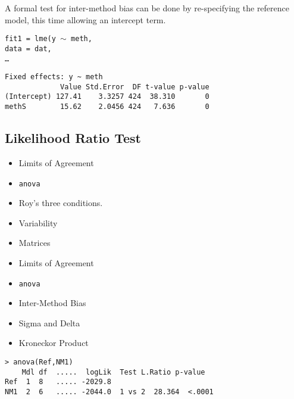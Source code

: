 \begin{frame}{\bf {}}
\begin{frame}{\bf {}}
\begin{itemize}
\begin{frame}[fragile]{\bf {}}
A formal test for inter-method bias can be done by re-specifying the reference model, this time allowing an intercept term.

\texttt{fit1 = lme(y $\sim$ meth,\\
   \hspace{0.6cm} data = dat,\\
   \hspace{0.6cm} \ldots}

\begin{verbatim}
Fixed effects: y ~ meth
             Value Std.Error  DF t-value p-value
(Intercept) 127.41    3.3257 424  38.310       0
methS        15.62    2.0456 424   7.636       0

\end{verbatim}
\end{frame}


\subsection{Likelihood Ratio Test}
\begin{frame}{\bf {}}
\begin{itemize}\itemsep0.7cm
\item Limits of Agreement
\item \texttt{anova}
\item Roy's three conditions.
\item Variability
\item Matrices
\end{itemize}
\end{frame}
\begin{frame}{\bf {}}
\begin{itemize}\itemsep0.7cm
\item Limits of Agreement
\item \texttt{anova}
\item Inter-Method Bias
\item Sigma and Delta
\item Kroneckor Product
\end{itemize}
\end{frame}
\begin{frame}[fragile]{\bf {}}
\begin{verbatim}
> anova(Ref,NM1)
    Mdl df  .....  logLik  Test L.Ratio p-value
Ref  1  8   ..... -2029.8
NM1  2  6   ..... -2044.0  1 vs 2  28.364  <.0001
\end{verbatim}
\end{frame}



\end{itemize}
\end{frame}
\end{frame}
